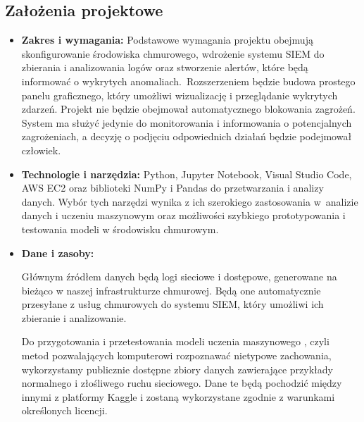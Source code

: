 \documentclass[11pt,a4paper,oneside]{article}
\newif\ifpodpowiedzi
\newcommand{\podpowiedz}[1]{\ifpodpowiedzi\par\begingroup\small\color{hintcolor}\textit{Wskazówka: #1}\par\endgroup\fi}
\begin{document}
\subsection{Założenia projektowe}
\podpowiedz{Określ zakres możliwy do wykonania przez zespół w jednym semestrze, z uwzględnieniem jego liczebności. Oddziel wymagania podstawowe od rozszerzeń, które zostaną wykonane, jeśli pozwoli na to czas. Poniższe punkty dostosuj do charakteru projektu.}
\begin{itemize}
\item \textbf{Zakres i wymagania:} {Podstawowe wymagania projektu obejmują skonfigurowanie środowiska chmurowego, wdrożenie systemu SIEM do zbierania i analizowania logów oraz stworzenie alertów, które będą informować o wykrytych anomaliach.~Rozszerzeniem będzie budowa prostego panelu graficznego, który umożliwi wizualizację i przeglądanie wykrytych zdarzeń. Projekt nie będzie obejmował automatycznego blokowania zagrożeń. System ma służyć jedynie do monitorowania i informowania o potencjalnych zagrożeniach, a decyzję o podjęciu odpowiednich działań będzie podejmował człowiek.}
\item \textbf{Technologie i narzędzia:} {Python, Jupyter Notebook, Visual Studio Code, AWS EC2 oraz biblioteki NumPy i Pandas do przetwarzania i analizy danych. Wybór tych narzędzi wynika z ich szerokiego zastosowania w~analizie danych i uczeniu maszynowym oraz możliwości szybkiego prototypowania i testowania modeli w środowisku chmurowym.}
\item \textbf{Dane i zasoby:} {Głównym źródłem danych będą logi sieciowe i dostępowe, generowane na bieżąco w naszej infrastrukturze chmurowej. Będą one automatycznie przesyłane z usług chmurowych do systemu SIEM, który umożliwi ich zbieranie i analizowanie.

Do przygotowania i przetestowania modeli uczenia maszynowego , czyli metod pozwalających komputerowi rozpoznawać nietypowe zachowania, wykorzystamy publicznie dostępne zbiory danych zawierające przykłady normalnego i złośliwego ruchu sieciowego. Dane te będą pochodzić między innymi z platformy Kaggle i zostaną wykorzystane zgodnie z warunkami określonych licencji.

}
\end{itemize}
\end{document}

